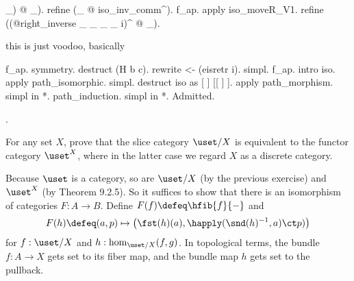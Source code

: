 \begin{coqdoccode}
\begin{coqdoccomment}
\_)\coqdocindent{0.50em}
@\coqdocindent{0.50em}
\_).\coqdoceol
\coqdocindent{1.00em}
refine\coqdocindent{0.50em}
(\_\coqdocindent{0.50em}
@\coqdocindent{0.50em}
iso\_inv\_comm\^{}).\coqdocindent{0.50em}
\coqdoceol
\coqdocindent{1.00em}
f\_ap.\coqdoceol
\coqdocindent{1.00em}
apply\coqdocindent{0.50em}
iso\_moveR\_V1.\coqdoceol
\coqdocindent{1.00em}
refine\coqdocindent{0.50em}
((@right\_inverse\coqdocindent{0.50em}
\_\coqdocindent{0.50em}
\_\coqdocindent{0.50em}
\_\coqdocindent{0.50em}
\_\coqdocindent{0.50em}
i)\^{}\coqdocindent{0.50em}
@\coqdocindent{0.50em}
\_).\coqdoceol
\coqdocindent{1.00em}
\begin{coqdoccomment}
\coqdocindent{0.50em}
this\coqdocindent{0.50em}
is\coqdocindent{0.50em}
just\coqdocindent{0.50em}
voodoo,\coqdocindent{0.50em}
basically\coqdocindent{0.50em}
\end{coqdoccomment}
\coqdoceol
\coqdocindent{1.00em}
f\_ap.\coqdocindent{0.50em}
symmetry.\coqdocindent{0.50em}
destruct\coqdocindent{0.50em}
(H\coqdocindent{0.50em}
b\coqdocindent{0.50em}
c).\coqdocindent{0.50em}
rewrite\coqdocindent{0.50em}
<-\coqdocindent{0.50em}
(eisretr\coqdocindent{0.50em}
i).\coqdocindent{0.50em}
simpl.\coqdocindent{0.50em}
f\_ap.\coqdoceol
\coqdoceol
\coqdocindent{1.00em}
intro\coqdocindent{0.50em}
iso.\coqdocindent{0.50em}
\coqdoceol
\coqdocindent{1.00em}
apply\coqdocindent{0.50em}
path\_isomorphic.\coqdocindent{0.50em}
simpl.\coqdoceol
\coqdocindent{1.00em}
destruct\coqdocindent{0.50em}
iso\coqdocindent{0.50em}
as\coqdocindent{0.50em}
[ ] [[ ]  ].\coqdoceol
\coqdocindent{1.00em}
apply\coqdocindent{0.50em}
path\_morphism.\coqdoceol
\coqdocindent{1.00em}
simpl\coqdocindent{0.50em}
in\coqdocindent{0.50em}
*.\coqdoceol
\coqdocindent{1.00em}
path\_induction.\coqdocindent{0.50em}
simpl\coqdocindent{0.50em}
in\coqdocindent{0.50em}
*.\coqdoceol
Admitted.\coqdoceol
\end{coqdoccomment}
\coqdoceol
\coqdocemptyline
\coqdocemptyline
\coqdocnoindent
{} .\coqdoceol
\coqdocemptyline
\end{coqdoccode}
For any set $X$, prove that the slice category $\uset/X$ is equivalent to the
functor category $\uset^{X}$, where in the latter case we regard $X$ as a
discrete category.


 \soln
Because $\uset$ is a category, so are $\uset/X$ (by the previous exercise) and
$\uset^{X}$ (by Theorem 9.2.5).  So it suffices to show that there is an
isomorphism of categories $F : A \to B$.  Define $F(f) \defeq \hfib{f}{-}$ and
\begin{align*}
  F(h) \defeq (a, p) \mapsto \left(\fst(h)(a), \happly(\snd(h)^{-1},a) \ct
  p)\right) 
\end{align*}
for $f : \uset/X$ and $h : \hom_{\uset/X}(f, g)$.  In topological terms, the
bundle $f : A \to X$ gets set to its fiber map, and the bundle map $h$ gets set
to the pullback.  


